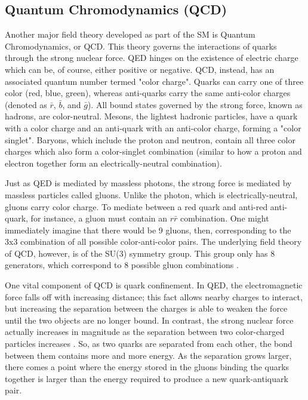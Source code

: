 \documentclass[12pt]{ucsddissertation}
\begin{document}
\subsection{Quantum Chromodynamics (QCD)}\label{sec:QCD}
Another major field theory developed as part of the SM is Quantum Chromodynamics, or QCD. This theory governs the interactions of quarks through the strong nuclear force. QED hinges on the existence of electric charge which can be, of course, either positive or negative. QCD, instead, has an associated quantum number termed "color charge". Quarks can carry one of three color (red, blue, green), whereas anti-quarks carry the same anti-color charges (denoted as $\bar{r}$, $\bar{b}$, and $\bar{g}$). All bound states governed by the strong force, known as hadrons, are color-neutral. Mesons, the lightest hadronic particles, have a quark with a color charge and an anti-quark with an anti-color charge, forming a "color singlet". Baryons, which include the proton and neutron, contain all three color charges which also form a color-singlet combination (similar to how a proton and electron together form an electrically-neutral combination). 

Just as QED is mediated by massless photons, the strong force is mediated by massless particles called gluons. Unlike the photon, which is electrically-neutral, gluons carry color charge. To mediate between a red quark and anti-red anti-quark, for instance, a gluon must contain an $r\bar{r}$ combination. One might immediately imagine that there would be 9 gluons, then, corresponding to the 3x3 combination of all possible color-anti-color pairs. The underlying field theory of QCD, however, is of the SU(3) symmetry group. This group only has 8 generators, which correspond to 8 possible gluon combinations \cite{PDGReview}. 

One vital component of QCD is quark confinement. In QED, the electromagnetic force falls off with increasing distance; this fact allows nearby charges to interact, but increasing the separation between the charges is able to weaken the force until the two objects are no longer bound. In contrast, the strong nuclear force actually increases in magnitude as the separation between two color-charged particles increases \cite{SMOverview}. So, as two quarks are separated from each other, the bond between them contains more and more energy. As the separation grows larger, there comes a point where the energy stored in the gluons binding the quarks together is larger than the energy required to produce a new quark-antiquark pair. 
\end{document}
